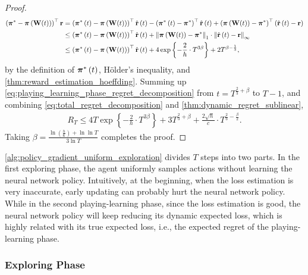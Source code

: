\begin{proof}
\begin{equation}
\begin{split}
    \left( {{\boldsymbol{\pi}}^*} - {\boldsymbol{\pi}}\left( {\mathbf{W}}(t) \right) \right)^\top {\mathbf{r}} &= \left( {{\boldsymbol{\pi}}^*\left(t\right)} - {\boldsymbol{\pi}}\left( {\mathbf{W}}(t) \right) \right)^\top \hat{{\mathbf{r}}}\left(t\right) - \left( {{\boldsymbol{\pi}}^*\left(t\right)} - {{\boldsymbol{\pi}}^*} \right)^\top \hat{{\mathbf{r}}}\left(t\right) + \left( {\boldsymbol{\pi}}\left( {\mathbf{W}}(t) \right) - {{\boldsymbol{\pi}}^*}\right)^\top \left( \hat{{\mathbf{r}}}\left(t\right) - {\mathbf{r}} \right) \\
    &\le \left( {{\boldsymbol{\pi}}^*\left(t\right)} - {\boldsymbol{\pi}}\left( {\mathbf{W}}(t) \right) \right)^\top \hat{{\mathbf{r}}}\left(t\right)  + \left\| {\boldsymbol{\pi}}\left( {\mathbf{W}}(t) \right) - {\boldsymbol{\pi}}^* \right\|_1 \cdot \left\| \hat{{\mathbf{r}}}\left(t\right) - {\mathbf{r}} \right\|_\infty  \\
    &\le \left( {{\boldsymbol{\pi}}^*\left(t\right)} - {\boldsymbol{\pi}}\left( {\mathbf{W}}(t) \right) \right)^\top \hat{{\mathbf{r}}}\left(t\right)  + 4 \exp\left\{ - \frac{2}{h} \cdot  T^{3\beta} \right\} + 2 T^{\beta - \frac{1}{3}},
\end{split}
\end{equation}
by the definition of ${\boldsymbol{\pi}}^*\left(t\right)$, H{\"o}lder's inequality, and \cref{thm:reward_estimation_hoeffding}. Summing up \cref{eq:playing_learning_phase_regret_decomposition} from $t = T^{\frac{2}{3} + \beta}$ to $T - 1$, and
combining \cref{eq:total_regret_decomposition} and \cref{thm:dynamic_regret_sublinear},
\begin{equation*}
\begin{split}
    R_T \le  4 T \exp\left\{ - \frac{2}{h} \cdot  T^{3\beta} \right\} + 3 T^{\frac{2}{3} + \beta} + \frac{2 \sqrt{h}}{ c} \cdot T^{\frac{2}{3} - \frac{\beta}{2}}.
\end{split}
\end{equation*}
Taking $\beta = \frac{ \ln{\left(\frac{h}{6}\right) + \ln{\ln{T}} } }{ 3 \ln{T}} $ completes the proof.
\end{proof}

\cref{alg:policy_gradient_uniform_exploration} divides $T$ steps into two parts. In the first exploring phase, the agent uniformly samples actions without learning the neural network policy. Intuitively, at the beginning, when the loss estimation is very inaccurate, early updating can probably hurt the neural network policy.  While in the second playing-learning phase, since the loss estimation is good, the neural network policy will keep reducing its dynamic expected loss, which is highly related with its true expected loss, i.e., the expected regret of the playing-learning phase.

\subsubsection{Exploring Phase}
\label{subsubsec:exploring_phase}

